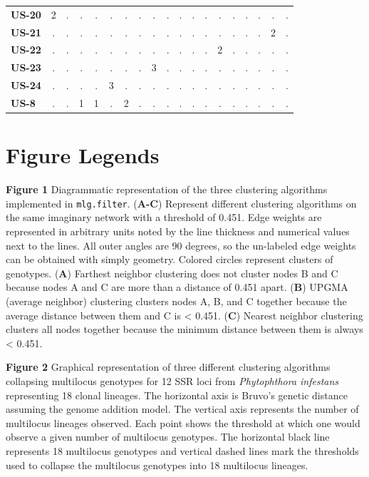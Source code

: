 \documentclass{frontiersSCNS} %
\begin{document}
\begin{table}[ht]
\begin{tabular}{l|cccccccccccccccccc}
  \textbf{US-20} & 2 & . & . & . & . & . & . & . & . & . & . & . & . & . & . & . & . & . \\ 
  \textbf{US-21} & . & . & . & . & . & . & . & . & . & . & . & . & . & . & . & . & 2 & . \\ 
  \textbf{US-22} & . & . & . & . & . & . & . & . & . & . & . & . & 2 & . & . & . & . & . \\ 
  \textbf{US-23} & . & . & . & . & . & . & . & 3 & . & . & . & . & . & . & . & . & . & . \\ 
  \textbf{US-24} & . & . & . & . & 3 & . & . & . & . & . & . & . & . & . & . & . & . & . \\ 
  \textbf{US-8} & . & . & 1 & 1 & . & 2 & . & . & . & . & . & . & . & . & . & . & . & . \\ 
   \hline
\end{tabular}
\end{table}

\section*{Figure Legends}\label{figure-legends}

\textbf{Figure 1} Diagrammatic representation of the three clustering
algorithms implemented in \texttt{mlg.filter}. (\textbf{A-C}) Represent
different clustering algorithms on the same imaginary network with a
threshold of 0.451. Edge weights are represented in arbitrary units
noted by the line thickness and numerical values next to the lines. All
outer angles are 90 degrees, so the un-labeled edge weights can be
obtained with simply geometry. Colored circles represent clusters of
genotypes. (\textbf{A}) Farthest neighbor clustering does not cluster
nodes B and C because nodes A and C are more than a distance of 0.451
apart. (\textbf{B}) UPGMA (average neighbor) clustering clusters nodes
A, B, and C together because the average distance between them and C is
\textless{} 0.451. (\textbf{C}) Nearest neighbor clustering clusters all
nodes together because the minimum distance between them is always
\textless{} 0.451.

\textbf{Figure 2} Graphical representation of three different clustering
algorithms collapsing multilocus genotypes for 12 SSR loci from
\emph{Phytophthora infestans} representing 18 clonal lineages. The
horizontal axis is Bruvo's genetic distance assuming the genome addition
model. The vertical axis represents the number of multilocus lineages
observed. Each point shows the threshold at which one would observe a
given number of multilocus genotypes. The horizontal black line
represents 18 multilocus genotypes and vertical dashed lines mark the
thresholds used to collapse the multilocus genotypes into 18 multilocus
lineages.
\end{document}
